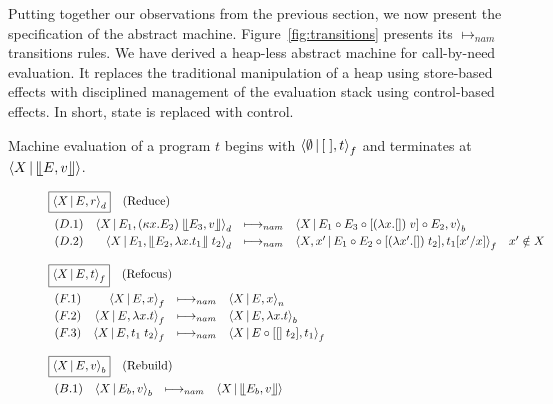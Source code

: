 \documentclass{LMCS}
\newcommand{\desc}[1]{\ensuremath{\text{(#1)}}}
\newenvironment{ltransitionrule}
  {\begin{array}{lrcll}}
  {\end{array}}
\newenvironment{boxedarray}[1]
  {\begin{lrbox}{\saveboxedarray}\begin{math}\begin{array}{#1}}
  {\end{array}\end{math}\end{lrbox}\fbox{\usebox{\saveboxedarray}}}
\theoremstyle{plain}
\theoremstyle{remark}
\newcommand{\nam}[0]{\ensuremath{\longmapsto_{nam}}}
\renewcommand{\comp}[0]{\ensuremath{\circ}}
\newcommand{\answer}[1]{\llfloor#1\rrfloor}
\newcommand{\refocus}[1]{\Braket{#1}_f}
\newcommand{\rebuild}[1]{\Braket{#1}_b}
\newcommand{\reduce}[1]{\Braket{#1}_d}
\newcommand{\need}[1]{\Braket{#1}_n}
\begin{document}
Putting together our observations from the previous section, we now present the
specification of the abstract machine.  Figure~\ref{fig:transitions} presents
its $\nam$ transitions rules.  We have derived a heap-less abstract machine for
call-by-need evaluation.
It replaces the traditional manipulation of a heap using store-based effects
with disciplined management of the evaluation stack using control-based
effects.  In short, state is replaced with control.

Machine evaluation of a program $t$ begins with $\refocus{\emptyset|[\;],t}$ and
terminates at $\Braket{X|\answer{E,v}}$.

\begin{figure*}
  \centering\small
  \begin{boxedarray}{@{}l@{}}
    \vspace{1ex}
   \boxed{\reduce{X|E,r}}\quad\desc{Reduce} \\
    \begin{ltransitionrule}
      (D.1) &
      \reduce{X | E_1, (\kappa x.E_2)\;\answer{E_3,v}} &
      \nam &
      \rebuild{X | E_1 \comp E_3 \comp [(\lambda x.[])\; v] \comp E_2, v} & \\[0.5ex]

      (D.2) &
      \reduce{X | E_1, \answer{E_2,\lambda x.t_1} \; t_2} &
      \nam &
      \refocus{X,x' | E_1 \comp E_2 \comp [(\lambda x'.[])\;t_2], t_1[x'/x]}
      & x' \notin X \\
    \end{ltransitionrule} \\  \\

    \vspace{1ex}
    \boxed{\refocus{X|E,t}}\quad\desc{Refocus} \\
    \begin{ltransitionrule}
      (F.1) &
      \refocus{X | E, x} & \nam & \need{X | E, x} & \\[0.5ex]

      (F.2) &
      \refocus{X | E, \lambda x.t} & \nam &
      \rebuild{X | E, \lambda x.t} & \\[0.5ex]

      (F.3) &
      \refocus{X | E, t_1\;t_2} & \nam &
      \refocus{X | E \comp [[]\;t_2], t_1} &
    \end{ltransitionrule} \\  \\

    \vspace{1ex}
    \boxed{\rebuild{X|E,v}}\quad\desc{Rebuild} \\
    \begin{ltransitionrule}
      (B.1) &
      \rebuild{X | E_b,v} & \nam & \Braket{X|\answer{E_b,v}} & \\[0.5ex]


\end{ltransitionrule}
\end{boxedarray}
\end{figure*}
\end{document}
